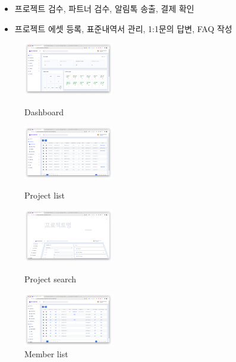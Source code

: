 \begin{itemize}
\begin{itemize}[label=$\star$]
\begin{itemize}
			            \item 프로젝트 검수, 파트너 검수, 알림톡 송출, 결제 확인
			            \item 프로젝트 에셋 등록, 표준내역서 관리, 1:1문의 답변, FAQ 작성
		            \end{itemize}
		            \begin{figure}[!ht]
			            \begin{fullwidth}
				            \parbox{0.35\textwidth}{
					            \centering
					            \includegraphics[width=0.35\textwidth]{images/builderhub-admin-dashboard.png}
					            \caption*{Dashboard}
				            }\qquad
				            \parbox{0.35\textwidth}{
					            \centering
					            \includegraphics[width=0.35\textwidth]{images/builderhub-admin-project-list.png}
					            \caption*{Project list}
				            }\qquad
				            \parbox{0.35\textwidth}{
					            \centering
					            \includegraphics[width=0.35\textwidth]{images/builderhub-admin-project-search.png}
					            \caption*{Project search}
				            }\qquad
				            \parbox{0.35\textwidth}{
					            \centering
					            \includegraphics[width=0.35\textwidth]{images/builderhub-admin-member-list.png}
					            \caption*{Member list}
}
\end{fullwidth}
\end{figure}
\end{itemize}
\end{itemize}
